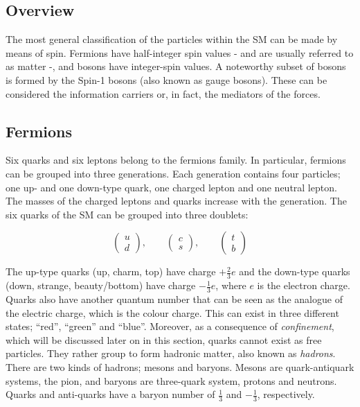 		\subsection{Overview}
		\label{sec:SMov}

			The most general classification of the particles within the SM can be made by means of spin. Fermions have half-integer spin values - and are usually referred to as matter -, and bosons have integer-spin values. A noteworthy subset of bosons is formed by the Spin-1 bosons (also known as gauge bosons). These can be considered the information carriers or, in fact, the mediators of the forces. 


			\subsection*{Fermions}

				Six quarks and six leptons belong to the fermions family. In particular, fermions can be grouped into three generations. Each generation contains four particles; one up- and one down-type quark, one charged lepton and one neutral lepton. The masses of the charged leptons and quarks increase with the generation. The six quarks of the SM can be grouped into three doublets:

				\begin{equation*}
				\label{eqn:quark_doublets}
					\begin{pmatrix} u \\ d \end{pmatrix}, \qquad 
					\begin{pmatrix} c \\ s \end{pmatrix}, \qquad 
					\begin{pmatrix} t \\ b \end{pmatrix}
				\end{equation*}

				\noindent The up-type quarks (up, charm, top) have charge $+\frac{2}{3}e$ and the down-type quarks (down, strange, beauty/bottom) have charge $-\frac{1}{3}e$, where $e$ is the electron charge. Quarks also have another quantum number that can be seen as the analogue of the electric charge, which is the colour charge. This can exist in three different states; ``red'', ``green'' and ``blue''. Moreover, as a consequence of \emph{confinement}, which will be discussed later on in this section, quarks cannot exist as free particles. They rather group to form hadronic matter, also known as \emph{hadrons}. There are two kinds of hadrons; mesons and baryons. Mesons are quark-antiquark systems, \eg the pion, and baryons are three-quark system, \eg protons and neutrons. Quarks and anti-quarks have a baryon number of $\frac{1}{3}$ and $-\frac{1}{3}$, respectively.

